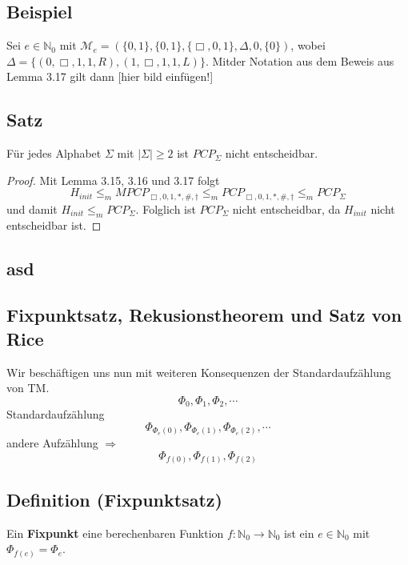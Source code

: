   \subsection{Beispiel} Sei $e \in \mathbb{N}_0$ mit $\mathcal{M}_e = (\{0, 1\}, \{0, 1\}, \{\Box, 0, 1\}, \Delta, 0, \{0\})$, wobei $\Delta = \{(0, \Box, 1, 1, R), (1, \Box, 1, 1, L)\}$. Mitder Notation aus dem Beweis aus Lemma 3.17 gilt dann [hier bild einfügen!]

  \subsection{Satz} Für jedes Alphabet $\Sigma$ mit $|\Sigma| \geq 2$ ist $PCP_{\Sigma}$ nicht entscheidbar. 
  \begin{proof}
    Mit Lemma 3.15, 3.16 und 3.17 folgt \[H_{init} \leq_m MPCP_{\Box, 0, 1, *, \#, \dagger} \leq_m PCP_{\Box, 0, 1, *, \#, \dagger} \leq_m PCP_{\Sigma}\] und damit $H_{init} \leq_m PCP_{\Sigma}$. Folglich ist $PCP_{\Sigma}$ nicht entscheidbar, da $H_{init}$ nicht entscheidbar ist.
  \end{proof}

  \subsection*{asd}


  \subsection{Fixpunktsatz, Rekusionstheorem und Satz von Rice} 
  
  Wir beschäftigen uns nun mit weiteren Konsequenzen der Standardaufzählung von TM. \[ \Phi_0, \Phi_1, \Phi_2, \cdots \] Standardaufzählung \[\Phi_{\Phi_e(0)}, \Phi_{\Phi_e(1)}, \Phi_{\Phi_e(2)}, \cdots\] andere Aufzählung $\Rightarrow$ \[\Phi_{f(0)}, \Phi_{f(1)}, \Phi_{f(2)}\]

  \subsection{Definition (Fixpunktsatz)} Ein \textbf{Fixpunkt} eine berechenbaren Funktion $f: \mathbb{N}_0 \to \mathbb{N}_0$ ist ein $e \in \mathbb{N}_0$ mit $\Phi_{f(e)} = \Phi_e$.

